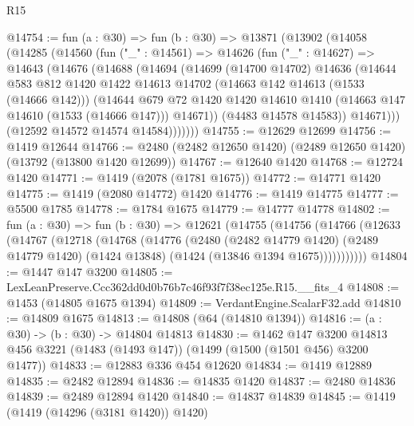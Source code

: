 \begin{lexlean}{R15}
\begin{coremodule}
@14754 := fun (a : @30) =>
  fun (b : @30) =>
  @13871
    (@13902
      (@14058
        (@14285
          (@14560
            (fun ("_" : @14561) =>
            @14626
              (fun ("_" : @14627) =>
              @14643
                (@14676
                  (@14688
                    (@14694
                      (@14699
                        (@14700 @14702)
                        @14636
                        (@14644
                          @583
                          @812
                          @1420
                          @1422
                          @14613
                          @14702
                          (@14663 @142 @14613 (@1533 (@14666 @142)))
                          (@14644
                            @679
                            @72
                            @1420
                            @1420
                            @14610
                            @1410
                            (@14663 @147 @14610 (@1533 (@14666 @147)))
                            @14671))
                        (@4483 @14578 @14583))
                      @14671)))
                (@12592 @14572 @14574 @14584)))))))
@14755 := @12629 @12699
@14756 := @1419 @12644
@14766 := @2480 (@2482 @12650 @1420) (@2489 @12650 @1420) (@13792 (@13800 @1420 @12699))
@14767 := @12640 @1420
@14768 := @12724 @1420
@14771 := @1419 (@2078 (@1781 @1675))
@14772 := @14771 @1420
@14775 := @1419 (@2080 @14772) @1420
@14776 := @1419 @14775
@14777 := @5500 @1785
@14778 := @1784 @1675
@14779 := @14777 @14778
@14802 := fun (a : @30) =>
  fun (b : @30) =>
  @12621
    (@14755
      (@14756
        (@14766
          (@12633
            (@14767
              (@12718
                (@14768
                  (@14776
                    (@2480
                      (@2482 @14779 @1420)
                      (@2489 @14779 @1420)
                      (@1424 @13848)
                      (@1424 (@13846 @1394 @1675)))))))))))
@14804 := @1447 @147 @3200
@14805 := LexLeanPreserve.Ccc362dd0d0b76b7c46f93f7f38ec125e.R15.__fits_4
@14808 := @1453 (@14805 @1675 @1394)
@14809 := VerdantEngine.ScalarF32.add
@14810 := @14809 @1675
@14813 := @14808 (@64 (@14810 @1394))
@14816 := (a : @30) -> (b : @30) -> @14804 @14813
@14830 := @1462
    @147
    @3200
    @14813
    @456
    @3221
    (@1483 (@1493 @147))
    (@1499 (@1500 (@1501 @456) @3200 @1477))
@14833 := @12883 @336 @454 @12620
@14834 := @1419 @12889
@14835 := @2482 @12894
@14836 := @14835 @1420
@14837 := @2480 @14836
@14839 := @2489 @12894 @1420
@14840 := @14837 @14839
@14845 := @1419 (@1419 (@14296 (@3181 @1420)) @1420)

\end{coremodule}
\end{lexlean}

